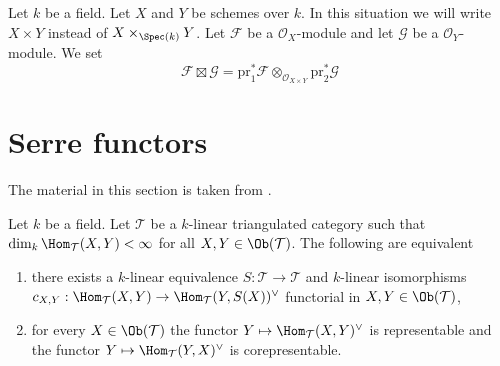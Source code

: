 \medskip\noindent
Let $k$ be a field. Let $X$ and $Y$ be schemes over $k$. In this
situation we will write $X \times Y$ instead of $X \times_{\Spec(k)} Y$.
Let $\mathcal{F}$ be a $\mathcal{O}_X$-module and let
$\mathcal{G}$ be a $\mathcal{O}_Y$-module. We set
$$
\mathcal{F} \boxtimes \mathcal{G} =
\text{pr}_1^*\mathcal{F} \otimes_{\mathcal{O}_{X \times Y}}
\text{pr}_2^*\mathcal{G}
$$





\section{Serre functors}
\label{section-Serre-functors}

\noindent
The material in this section is taken from \cite{Bondal-Kapranov}.

\begin{lemma}
\label{lemma-Serre-functor-exists}
Let $k$ be a field. Let $\mathcal{T}$ be a $k$-linear
triangulated category such that $\dim_k \Hom_\mathcal{T}(X, Y) < \infty$
for all $X, Y \in \Ob(\mathcal{T})$. The following are equivalent
\begin{enumerate}
\item there exists a $k$-linear equivalence
$S : \mathcal{T} \to \mathcal{T}$ and $k$-linear isomorphisms
$c_{X, Y} : \Hom_\mathcal{T}(X, Y) \to \Hom_\mathcal{T}(Y, S(X))^\vee$
functorial in $X, Y \in \Ob(\mathcal{T})$,
\item for every $X \in \Ob(\mathcal{T})$
the functor $Y \mapsto \Hom_\mathcal{T}(X, Y)^\vee$
is representable and the functor $Y \mapsto \Hom_\mathcal{T}(Y, X)^\vee$
is corepresentable.
\end{enumerate}
\end{lemma}

